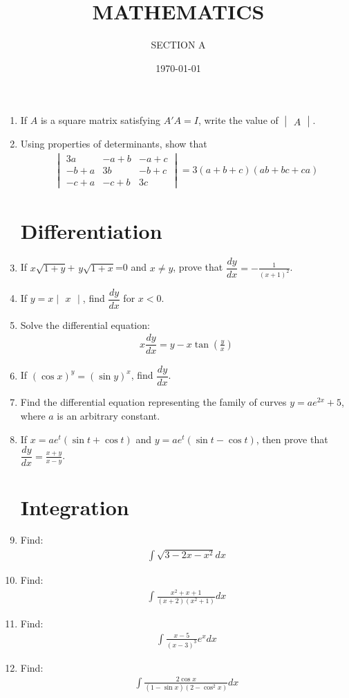 \documentclass[2pt,-letter paper]{article}
\title{MATHEMATICS}
\author{SECTION A}
\date{\today}
\providecommand{\brak}[1]{\ensuremath{\left(#1\right)}}
\newcommand{\mydet}[1]{\ensuremath{\begin{vmatrix}#1\end{vmatrix}}}
\begin{document}
\maketitle

\begin{enumerate}
\section{Matrix}
\item If ${A}$ is a square matrix satisfying ${A'A}= I$, write the value of $\mydet{A}$.
\item Using properties of determinants, show that 
\begin{align*}
\mydet{3a & -a+b & -a+c \\ -b+a & 3b & -b+c \\ -c+a & -c+b & 3c} = 3\brak{a+b+c}\brak{ab+bc+ca}
\end{align*}	
\section{Differentiation}
\item If $x\sqrt{1+y}$+ $y\sqrt{1+x}$=0 and $x\neq y$, prove that $\dfrac{dy}{dx} = -\frac{1}{\brak{x+1}^2}$.
\item If $y=x\mydet{x}$, find $\dfrac{dy}{dx}$ for $x < 0$.
\item Solve the differential equation: 
\begin{align*}
{x}\dfrac{dy}{dx}= {y}-{x}\tan\brak{\frac{y}{x}}
\end{align*}
\item If $\brak{\cos x}^y = \brak{\sin y }^x$, find $\dfrac{dy}{dx}$.
\item Find the differential equation representing the family of curves ${y}=ae^{2x}+5$, where $a$ is an arbitrary constant.
\item If ${x}=ae^t\brak{\sin{t}+\cos{t}}$ and ${y}=ae^t\brak{\sin{t}-\cos{t}}$, then prove that $\dfrac{dy}{dx}=\frac{x+y}{x-y}$.
\section{Integration}
\item Find: \begin{align*}\int\sqrt{3-2x-x^2}dx\end{align*}
\item Find: \begin{align*}\int{\frac{x^2+x+1}{\brak{x+2}\brak{x^2+1}}}dx\end{align*}
\item Find: 
 \begin{align*}
 \int{\frac{x-5}{\brak{x-3}^3}}e^x dx
 \end{align*}
\item Find: 
\begin{align*}
\int{\frac{2\cos x}{\brak{1-\sin x}\brak{2-\cos^2 x}}}dx
\end{align*}  

\end{enumerate}
\end{document}
